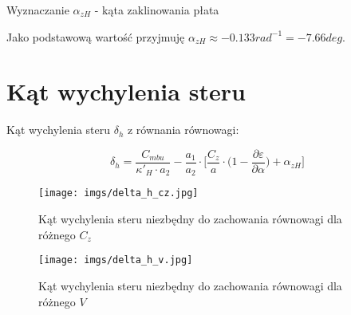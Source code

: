 \documentclass{sprawozdanie}
\begin{document}
\begin{table}[h!]
    \let\center\empty
    \centering
    \resizebox{0.99\width}{!}{}
    \caption{Wyznaczanie $\alpha_{zH}$  - kąta zaklinowania płata}
    \label{tab:azh}
\end{table}
\FloatBarrier

Jako podstawową wartość przyjmuję $\alpha_{zH} \approx -0.133 rad^{-1}= -7.66 deg$.

\section{Kąt wychylenia steru}
Kąt wychylenia steru $\delta_h$ z równania równowagi:

\begin{equation}
    \delta_h = \frac{C_{mbu}}{\kappa'_{H}\cdot a_2}-\frac{a_1}{a_2}\cdot \Bigg[\frac{C_z}{a} \cdot \Big (1- \frac{\partial \varepsilon}{\partial \alpha} \Big)+\alpha_{zH} \Bigg]
\end{equation}


\begin{figure}[h!]
    \centering
    \texttt{[image: imgs/delta\_h\_cz.jpg]}
    \caption{Kąt wychylenia steru niezbędny do zachowania równowagi dla różnego $C_z$}
    \label{fig:deltahcz}
\end{figure}
\FloatBarrier

\begin{figure}[h!]
    \centering
    \texttt{[image: imgs/delta\_h\_v.jpg]}

    \caption{Kąt wychylenia steru niezbędny do zachowania równowagi dla różnego $V$}
    \label{fig:deltahv}
\end{figure}
\FloatBarrier
\end{document}
